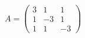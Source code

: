 \documentclass[preview]{standalone}
\begin{document}
\begin{align*}
A = \begin{pmatrix}3 & 1 & 1 \\1 & -3 & 1 \\1 & 1 & -3\end{pmatrix}
\end{align*}
\end{document}
